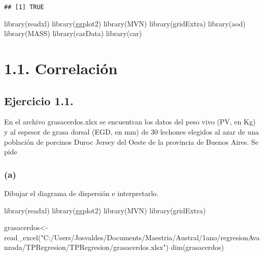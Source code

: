\documentclass[
]{article}
\newenvironment{Shaded}{\begin{snugshade}}{\end{snugshade}}
\newcommand{\FunctionTok}[1]{\textcolor[rgb]{0.00,0.00,0.00}{#1}}
\newcommand{\NormalTok}[1]{#1}
\newcommand{\OtherTok}[1]{\textcolor[rgb]{0.56,0.35,0.01}{#1}}
\newcommand{\StringTok}[1]{\textcolor[rgb]{0.31,0.60,0.02}{#1}}
\begin{document}
\begin{verbatim}
## [1] TRUE
\end{verbatim}

\begin{Shaded}
\begin{Highlighting}[]
\FunctionTok{library}\NormalTok{(readxl)}
\FunctionTok{library}\NormalTok{(ggplot2)}
\FunctionTok{library}\NormalTok{(MVN)}
\FunctionTok{library}\NormalTok{(gridExtra)}
\FunctionTok{library}\NormalTok{(aod)}
\FunctionTok{library}\NormalTok{(MASS)}
\FunctionTok{library}\NormalTok{(carData)}
\FunctionTok{library}\NormalTok{(car)}
\end{Highlighting}
\end{Shaded}

\hypertarget{correlaciuxf3n}{%
\section{\texorpdfstring{{1.1.
Correlación}}{1.1. Correlación}}\label{correlaciuxf3n}}

\hypertarget{ejercicio-1.1.}{%
\subsection{Ejercicio 1.1.}\label{ejercicio-1.1.}}

En el archivo grasacerdos.xlsx se encuentran los datos del peso vivo
(PV, en Kg) y al espesor de grasa dorsal (EGD, en mm) de 30 lechones
elegidos al azar de una población de porcinos Duroc Jersey del Oeste de
la provincia de Buenos Aires. Se pide

\hypertarget{a}{%
\subsubsection{(a)}\label{a}}

Dibujar el diagrama de dispersión e interpretarlo.

\begin{Shaded}
\begin{Highlighting}[]
\FunctionTok{library}\NormalTok{(readxl)}
\FunctionTok{library}\NormalTok{(ggplot2)}
\FunctionTok{library}\NormalTok{(MVN)}
\FunctionTok{library}\NormalTok{(gridExtra)}

\NormalTok{grasacerdos}\OtherTok{\textless{}{-}}\FunctionTok{read\_excel}\NormalTok{(}\StringTok{"C:/Users/Josvaldes/Documents/Maestria/Austral/1ano/regresionAvanzada/TPRegresion/TPRegresion/grasacerdos.xlsx"}\NormalTok{)}
\FunctionTok{dim}\NormalTok{(grasacerdos)}
\end{Highlighting}
\end{Shaded}
\end{document}
